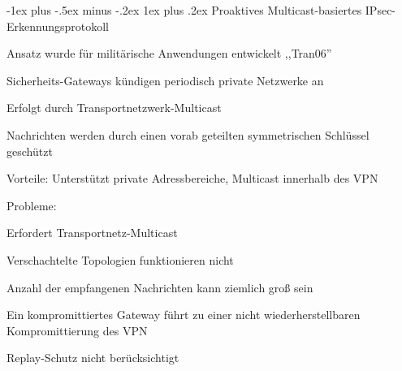 \documentclass[a4paper]{article}
\makeatletter
\renewcommand{\subsubsection}{\@startsection{subsubsection}{3}{0mm}%
 {-1ex plus -.5ex minus -.2ex}%
 {1ex plus .2ex}%
 {\normalfont\small\bfseries}}
\makeatother
\begin{document}
\begin{multicols}{3}
\begin{itemize*}
            \subsubsection{Proaktives Multicast-basiertes
                  IPsec-Erkennungsprotokoll}
            \begin{itemize*}
                  \item Ansatz wurde für militärische Anwendungen entwickelt ,,Tran06''
                  \item Sicherheits-Gateways kündigen periodisch private Netzwerke an
                  \item Erfolgt durch Transportnetzwerk-Multicast
                  \item Nachrichten werden durch einen vorab geteilten symmetrischen Schlüssel
                  geschützt
                  \item Vorteile: Unterstützt private Adressbereiche, Multicast innerhalb des
                  VPN
                  \item Probleme:
                  \begin{itemize*}
                        \item Erfordert Transportnetz-Multicast
                        \item Verschachtelte Topologien funktionieren nicht
                        \item Anzahl der empfangenen Nachrichten kann ziemlich groß sein
                        \item Ein kompromittiertes Gateway führt zu einer nicht wiederherstellbaren Kompromittierung des VPN
                        \item Replay-Schutz nicht berücksichtigt
                  \end{itemize*}
            \end{itemize*}


\end{itemize*}
\end{multicols}
\end{document}

